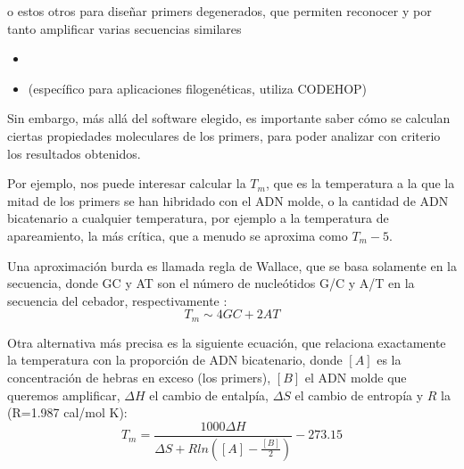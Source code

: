 o estos otros para dise\~nar primers degenerados, que permiten reconocer y por tanto amplificar varias secuencias similares
\begin{itemize}
\item {} 
\item {} (espec\'{i}fico para aplicaciones filogen\'{e}ticas, utiliza CODEHOP)
\end{itemize}

Sin embargo, m\'{a}s all\'{a} del software elegido, es importante saber c\'{o}mo se calculan ciertas propiedades moleculares de los primers,
para poder analizar con criterio los resultados obtenidos. 

Por ejemplo, nos puede interesar calcular la $T_{m}$, 
que es la temperatura a la que la mitad de los primers se han hibridado con el ADN molde, 
o la cantidad de ADN bicatenario a cualquier temperatura, por ejemplo a la temperatura de apareamiento, 
la m\'{a}s cr\'{i}tica, que a menudo se aproxima como $T_{m} - 5$.

Una aproximaci\'{o}n burda es llamada regla de Wallace, que se basa solamente en la secuencia,
donde GC y AT son el n\'{u}mero de nucle\'{o}tidos G/C y A/T en la secuencia del cebador, respectivamente \citep{Santalucia2007}:
\begin{equation}
T_{m} \sim 4GC + 2AT
\end{equation}

Otra alternativa m\'{a}s precisa es la siguiente ecuaci\'{o}n, 
que relaciona exactamente la temperatura con la proporci\'{o}n de ADN bicatenario,
donde $[A]$ es la concentraci\'{o}n de hebras en exceso (los primers), $[B]$ el ADN molde que queremos amplificar,
$\Delta H$ el cambio de entalp\'{i}a, $\Delta S$ el cambio de entrop\'{i}a y $R$ la 
 (R=1.987 cal/mol K):
\begin{equation}
T_{m} = \frac{1000 \Delta H}{\Delta S + Rln([A]-\frac{[B]}{2})} - 273.15
\end{equation}


